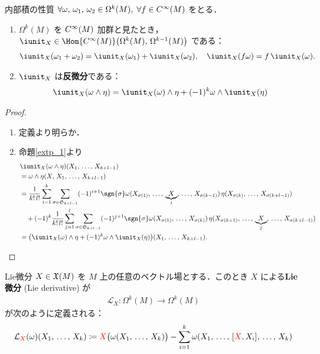 \documentclass[geometry_main]{subfiles}
\begin{document}
\begin{myprop}[label=prop.int_prod]{内部積の性質}
	$\forall \omega,\, \omega_1,\, \omega_2 \in \Omega^k(M),\; \forall f \in C^\infty(M)$ をとる．
	\begin{enumerate} 
		\item $\Omega^k(M)$ を $C^\infty(M)$ 加群と見たとき，$\iunit_X \in \Hom{\cinftyf{M}}\bigl(\Omega^k(M),\,\Omega^{k-1}(M)\bigr)$ である：
		\begin{align} 
			\iunit_X(\omega_1 + \omega_2) = \iunit_X(\omega_1) + \iunit_X(\omega_2),\quad \iunit_X(f \omega) = f\, \iunit_X(\omega).
		\end{align}
		\item $\iunit_X$ は\textbf{反微分}である：
		\begin{align} 
			\iunit_X(\omega \wedge \eta) = \iunit_X(\omega) \wedge \eta + (-1)^k \omega \wedge \iunit_X(\eta)
		\end{align}
	\end{enumerate}
\end{myprop}

\begin{proof} 
	\begin{enumerate} 
		\item 定義より明らか．
		\item 命題\ref{extp_1}より
		\begin{align} 
			&\iunit_X(\omega \wedge \eta) (X_1,\, \dots,\, X_{k+l-1}) \\
			&= \omega \wedge \eta (X,\, X_1,\, \dots,\, X_{k+l-1}) \\
			&= \frac{1}{k!\, l!} \sum_{i=1}^k \sum_{\sigma \in \mathfrak{S}_{k+l-1}} (-1)^{i+1}\sgn{\sigma} \omega(X_{\sigma(1)},\, \dots ,\, \underbrace{X}_{i} ,\,\dots,\, X_{\sigma(k-1)})\, \eta(X_{\sigma(k)},\, \dots ,\, X_{\sigma(k+l-1)}) \\
			&\quad + (-1)^k \frac{1}{k!\, l!} \sum_{j=1}^l \sum_{\sigma \in \mathfrak{S}_{k+l-1}} (-1)^{j+1}\sgn{\sigma} \omega(X_{\sigma(1)},\, \dots ,\, X_{\sigma(k)})\, \eta(X_{\sigma(k+1)},\, \dots ,\, \underbrace{X}_{j} ,\,\dots,\, X_{\sigma(k+l-1)}) \\
			&= \bigl(\iunit_X(\omega) \wedge \eta + (-1)^k \omega \wedge \iunit_X(\eta)\bigr) (X_1,\, \dots,\, X_{k+l-1}).
		\end{align}
	\end{enumerate}
\end{proof}

\begin{mydef}[label=Lie_diff]{Lie微分}
	$X \in \mathfrak{X}(M)$ を $M$ 上の任意のベクトル場とする．このとき $X$ による\textbf{Lie微分} (Lie derivative) が
	\begin{align} 
		\mathcal{L}_X \colon \Omega^k(M) \to \Omega^{k}(M)
	\end{align}
	が次のように定義される：
	\begin{align} 
		\mathcal{L}_{\textcolor{red}{X}}(\omega)(X_1,\, \dots ,\, X_k) \coloneqq \textcolor{red}{X}\bigl(\omega(X_1,\, \dots ,\, X_k)\bigr) - \sum_{i=1}^k \omega(X_1,\, \dots ,\, \comm{\textcolor{red}{X}}{X_i},\, \dots ,\, X_k)
	\end{align}
\end{mydef}
\end{document}
